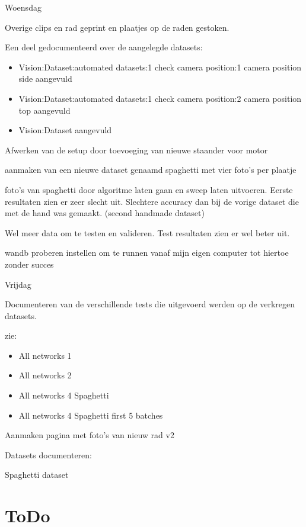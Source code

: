 \documentclass{article}
\begin{document}
Woensdag

Overige clips en rad geprint en plaatjes op de raden gestoken. 

Een deel gedocumenteerd over de aangelegde datasets:

\begin{itemize}
\item Vision:Dataset:automated datasets:1 check camera position:1 camera position side aangevuld
\item Vision:Dataset:automated datasets:1 check camera position:2 camera position top aangevuld
\item Vision:Dataset aangevuld
\end{itemize}




Afwerken van de setup door toevoeging van nieuwe staander voor motor

aanmaken van een nieuwe dataset genaamd spaghetti met vier foto's per plaatje



foto's van spaghetti door algoritme laten gaan en sweep laten uitvoeren. Eerste resultaten zien er zeer slecht uit. Slechtere accuracy dan bij de vorige dataset die met de hand was gemaakt. (second handmade dataset)

Wel meer data om te testen en valideren. Test resultaten zien er wel beter uit.



wandb proberen instellen om te runnen vanaf mijn eigen computer tot hiertoe zonder succes



Vrijdag

Documenteren van de verschillende tests die uitgevoerd werden op de verkregen datasets.

zie:

\begin{itemize}
\item All networks 1
\item All networks 2
\item All networks 4 Spaghetti
\item All networks 4 Spaghetti first 5 batches
\end{itemize}


Aanmaken pagina met foto's van nieuw rad v2



Datasets documenteren:

Spaghetti dataset


		\section{ToDo}
\end{document}
